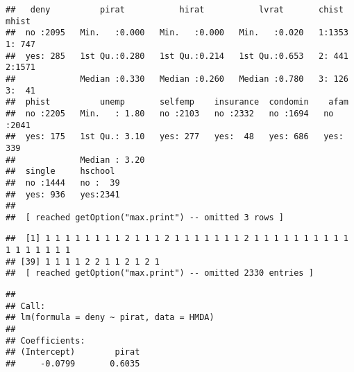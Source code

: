 \documentclass[
]{article}
\newenvironment{Shaded}{\begin{snugshade}}{\end{snugshade}}
\newcommand{\CommentTok}[1]{\textcolor[rgb]{0.56,0.35,0.01}{\textit{#1}}}
\newcommand{\DataTypeTok}[1]{\textcolor[rgb]{0.13,0.29,0.53}{#1}}
\newcommand{\DecValTok}[1]{\textcolor[rgb]{0.00,0.00,0.81}{#1}}
\newcommand{\KeywordTok}[1]{\textcolor[rgb]{0.13,0.29,0.53}{\textbf{#1}}}
\newcommand{\NormalTok}[1]{#1}
\newcommand{\OperatorTok}[1]{\textcolor[rgb]{0.81,0.36,0.00}{\textbf{#1}}}
\newcommand{\StringTok}[1]{\textcolor[rgb]{0.31,0.60,0.02}{#1}}
\begin{document}
\begin{verbatim}
##   deny          pirat           hirat           lvrat       chist    mhist   
##  no :2095   Min.   :0.000   Min.   :0.000   Min.   :0.020   1:1353   1: 747  
##  yes: 285   1st Qu.:0.280   1st Qu.:0.214   1st Qu.:0.653   2: 441   2:1571  
##             Median :0.330   Median :0.260   Median :0.780   3: 126   3:  41  
##  phist          unemp       selfemp    insurance  condomin    afam     
##  no :2205   Min.   : 1.80   no :2103   no :2332   no :1694   no :2041  
##  yes: 175   1st Qu.: 3.10   yes: 277   yes:  48   yes: 686   yes: 339  
##             Median : 3.20                                              
##  single     hschool   
##  no :1444   no :  39  
##  yes: 936   yes:2341  
##                       
##  [ reached getOption("max.print") -- omitted 3 rows ]
\end{verbatim}

\begin{Shaded}
\end{Shaded}

\begin{verbatim}
##  [1] 1 1 1 1 1 1 1 1 2 1 1 1 2 1 1 1 1 1 1 1 2 1 1 1 1 1 1 1 1 1 1 1 1 1 1 1 1 1
## [39] 1 1 1 1 2 2 1 1 2 1 2 1
##  [ reached getOption("max.print") -- omitted 2330 entries ]
\end{verbatim}

\begin{Shaded}
\end{Shaded}

\begin{verbatim}
## 
## Call:
## lm(formula = deny ~ pirat, data = HMDA)
## 
## Coefficients:
## (Intercept)        pirat  
##     -0.0799       0.6035
\end{verbatim}
\end{document}
